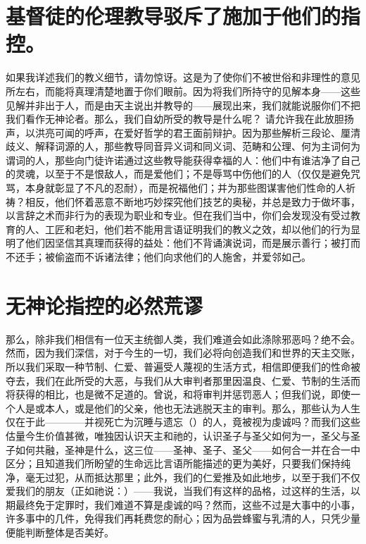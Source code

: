 
\section{基督徒的伦理教导驳斥了施加于他们的指控。}

如果我详述我们的教义细节，请勿惊讶。这是为了使你们不被世俗和非理性的意见所左右，而能将真理清楚地置于你们眼前。因为将我们所持守的见解本身——这些见解并非出于人，而是由天主说出并教导的——展现出来，我们就能说服你们不把我们看作无神论者。那么，我们自幼所受的教导是什么呢？ 请允许我在此放胆扬声，以洪亮可闻的呼声，在爱好哲学的君王面前辩护。因为那些解析三段论、厘清歧义、解释词源的人，那些教导同音异义词和同义词、范畴和公理、何为主词何为谓词的人，那些向门徒许诺通过这些教导能获得幸福的人：他们中有谁洁净了自己的灵魂，以至于不是恨敌人，而是爱他们；不是辱骂中伤他们的人（仅仅是避免咒骂，本身就彰显了不凡的忍耐），而是祝福他们；并为那些图谋害他们性命的人祈祷？相反，他们怀着恶意不断地巧妙探究他们技艺的奥秘，并总是致力于做坏事，以言辞之术而非行为的表现为职业和专业。但在我们当中，你们会发现没有受过教育的人、工匠和老妇，他们若不能用言语证明我们的教义之效，却以他们的行为显明了他们因坚信其真理而获得的益处：他们不背诵演说词，而是展示善行；被打而不还手；被偷盗而不诉诸法律；他们向求他们的人施舍，并爱邻如己。\par


\section{无神论指控的必然荒谬}

那么，除非我们相信有一位天主统御人类，我们难道会如此涤除邪恶吗？绝不会。然而，因为我们深信，对于今生的一切，我们必将向创造我们和世界的天主交账，所以我们采取一种节制、仁爱、普遍受人蔑视的生活方式，相信即便我们的性命被夺去，我们在此所受的大恶，与我们从大审判者那里因温良、仁爱、节制的生活而将获得的相比，也是微不足道的。曾说，和将审判并惩罚恶人；但我们说，即使一个人是或本人，或是他们的父亲，他也无法逃脱天主的审判。那么，那些认为人生仅在于此————并视死亡为沉睡与遗忘（）的人，竟被视为虔诚吗？而我们这些估量今生价值甚微，唯独因认识天主和祂的，认识圣子与圣父如何为一，圣父与圣子如何共融，圣神是什么，这三位——圣神、圣子、圣父——如何合一并在合一中区分；且知道我们所盼望的生命远比言语所能描述的更为美好，只要我们保持纯净，毫无过犯，从而抵达那里；此外，我们的仁爱推及如此地步，以至于我们不仅爱我们的朋友（正如祂说：）——我说，当我们有这样的品格，过这样的生活，以期最终免于定罪时，我们难道不算是虔诚的吗？然而，这些不过是大事中的小事，许多事中的几件，免得我们再耗费您的耐心；因为品尝蜂蜜与乳清的人，只凭少量便能判断整体是否美好。\par

